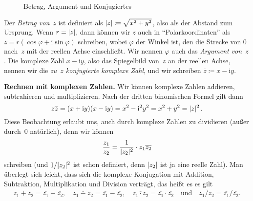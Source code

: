 \begin{wrapfigure}{r}{0.25\textwidth}
	\centering\vspace{-0.44cm}
	Betrag, Argument und Konjugiertes\vspace{-0.5cm}
\end{wrapfigure}
Der \emph{Betrag von~$z$} ist definiert als $\lvert z\rvert\coloneqq \sqrt{x^2+y^2}$, also als der Abstand zum Ursprung. Wenn $r=\lvert z\rvert$, dann können wir $z$ auch in \enquote{Polarkoordinaten} als $z=r(\cos\varphi+\mathrm{i}\sin\varphi)$ schreiben, wobei $\varphi$ der Winkel ist, den die Strecke von $0$ nach~$z$ mit der reellen Achse einschließt. Wir nennen $\varphi$ auch das \emph{Argument von~$z$}. Die komplexe Zahl $x-\mathrm{i} y$, also das Spiegelbild von~$z$ an der reellen Achse, nennen wir die \emph{zu~$z$ konjugierte komplexe Zahl}, und wir schreiben $\overline{z}\coloneqq x-\mathrm{i} y$.

\textbf{Rechnen mit komplexen Zahlen.} Wir können komplexe Zahlen addieren, subtrahieren und multiplizieren. Nach der dritten binomischen Formel gilt dann 
\begin{equation*}
	z\overline{z}=(x+\mathrm{i} y)(x-\mathrm{i} y)=x^2-\mathrm{i}^2y^2=x^2+y^2=\lvert z\rvert^2\,.
\end{equation*}
Diese Beobachtung erlaubt uns, auch durch komplexe Zahlen zu dividieren (außer durch~$0$ natürlich), denn wir können 
\begin{equation*}
	\frac{z_1}{z_2}=\frac{1}{\lvert z_2\rvert^2}\cdot z_1\overline{z_2}
\end{equation*}
schreiben (und $1/\lvert z_2\rvert^2$ ist schon definiert, denn $\lvert z_2\rvert$ ist ja eine reelle Zahl). Man überlegt sich leicht, dass sich die komplexe Konjugation mit Addition, Subtraktion, Multiplikation und Division verträgt,
das heißt es es gilt
\begin{equation*}
	\overline{z_1+z_2}=\overline{z_1}+\overline{z_2},\quad
	\overline{z_1-z_2}=\overline{z_1}-\overline{z_2},\quad
	\overline{z_1\cdot z_2}=\overline{z_1}\cdot \overline{z_2}\quad
	\text{und}\quad
	\overline{z_1/z_2}=\overline{z_1}/\overline{z_2}.
\end{equation*}

